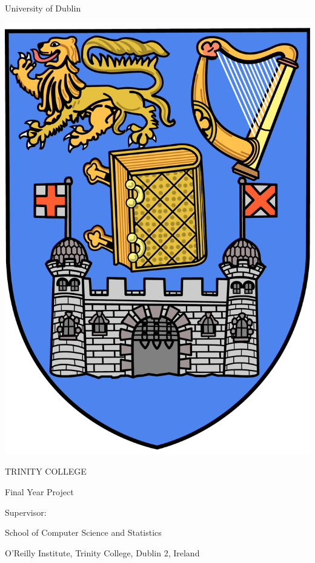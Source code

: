 \thispagestyle{empty}

{
  \centering

  \sffamily

  {\Large University of Dublin}

  \vspace{10pt}

  \includegraphics[scale=0.12]{tcd/trinitycollege.pdf}

  \vspace{10pt}

  {\Huge TRINITY COLLEGE}

  \vspace{80pt}

  \textbf{ \Large \emph \projecttitle}

  \vspace{30pt}

  \authorname

  \degreetitle

  Final Year Project \datenospace

  Supervisor: \supervisorname

  \vspace{100pt}

  \large{
    School of Computer Science and Statistics

    O'Reilly Institute, Trinity College, Dublin 2, Ireland
  }

}


